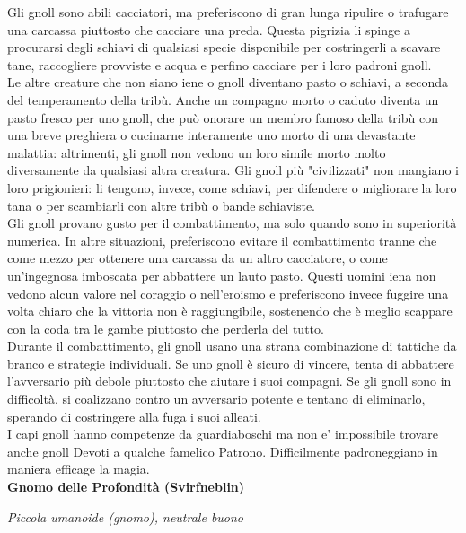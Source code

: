\begin{multicols}{2}
Gli gnoll sono abili cacciatori, ma preferiscono di gran lunga ripulire o trafugare una carcassa piuttosto che cacciare una preda. Questa pigrizia li spinge a procurarsi degli schiavi di qualsiasi specie disponibile per costringerli a scavare tane, raccogliere provviste e acqua e perfino cacciare per i loro padroni gnoll.\\

Le altre creature che non siano iene o gnoll diventano pasto o schiavi, a seconda del temperamento della tribù. Anche un compagno morto o caduto diventa un pasto fresco per uno gnoll, che può onorare un membro famoso della tribù con una breve preghiera o cucinarne interamente uno morto di una devastante malattia: altrimenti, gli gnoll non vedono un loro simile morto molto diversamente da qualsiasi altra creatura. Gli gnoll più "civilizzati" non mangiano i loro prigionieri: li tengono, invece, come schiavi, per difendere o migliorare la loro tana o per scambiarli con altre tribù o bande schiaviste.\\

Gli gnoll provano gusto per il combattimento, ma solo quando sono in superiorità numerica. In altre situazioni, preferiscono evitare il combattimento tranne che come mezzo per ottenere una carcassa da un altro cacciatore, o come un'ingegnosa imboscata per abbattere un lauto pasto. Questi uomini iena non vedono alcun valore nel coraggio o nell'eroismo e preferiscono invece fuggire una volta chiaro che la vittoria non è raggiungibile, sostenendo che è meglio scappare con la coda tra le gambe piuttosto che perderla del tutto.\\

Durante il combattimento, gli gnoll usano una strana combinazione di tattiche da branco e strategie individuali. Se uno gnoll è sicuro di vincere, tenta di abbattere l'avversario più debole piuttosto che aiutare i suoi compagni. Se gli gnoll sono in difficoltà, si coalizzano contro un avversario potente e tentano di eliminarlo, sperando di costringere alla fuga i suoi alleati.\\

I capi gnoll hanno competenze da guardiaboschi ma non e' impossibile trovare anche gnoll Devoti a qualche famelico Patrono. Difficilmente padroneggiano in maniera efficage la magia.\\


\medskip{}\textbf{Gnomo delle Profondità (Svirfneblin)}

\emph{Piccola umanoide (gnomo), neutrale buono}


\end{multicols}
